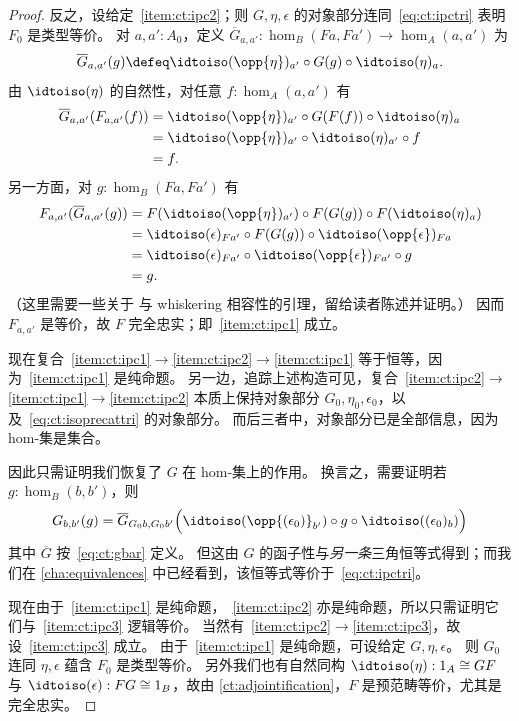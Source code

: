\begin{proof}
  反之，设给定~\ref{item:ct:ipc2}；则 $G,\eta,\epsilon$ 的对象部分连同~\eqref{eq:ct:ipctri} 表明 $F_0$ 是类型等价。
  对 $a,a':A_0$，定义 $\overline{G}_{a,a'}: \hom_B(Fa,Fa') \to \hom_A(a,a')$ 为
  \begin{equation}
    \overline{G}_{a,a'}(g) \defeq \idtoiso(\opp{\eta})_{a'} \circ G(g) \circ \idtoiso(\eta)_a.\label{eq:ct:gbar}
  \end{equation}
  由 $\idtoiso(\eta)$ 的自然性，对任意 $f:\hom_A(a,a')$ 有
  \begin{align*}
    \overline{G}_{a,a'}(F_{a,a'}(f))
    &= \idtoiso(\opp{\eta})_{a'} \circ G(F(f)) \circ \idtoiso(\eta)_a\\
    &= \idtoiso(\opp{\eta})_{a'} \circ \idtoiso(\eta)_{a'} \circ f \\
    &= f.
  \end{align*}
  另一方面，对 $g:\hom_B(Fa,Fa')$ 有
  \begin{align*}
    F_{a,a'}(\overline{G}_{a,a'}(g))
    &= F(\idtoiso(\opp{\eta})_{a'}) \circ F(G(g)) \circ F(\idtoiso(\eta)_a)\\
    &= \idtoiso(\epsilon)_{Fa'}
    \circ F(G(g))
    \circ \idtoiso(\opp{\epsilon})_{Fa}\\
    &= \idtoiso(\epsilon)_{Fa'}
    \circ \idtoiso(\opp{\epsilon})_{Fa'}
    \circ g\\
    &= g.
  \end{align*}
  （这里需要一些关于 \idtoiso 与 whiskering 相容性的引理，留给读者陈述并证明。）
  因而 $F_{a,a'}$ 是等价，故 $F$ 完全忠实；即~\ref{item:ct:ipc1} 成立。

  现在复合~\ref{item:ct:ipc1}$\to$\ref{item:ct:ipc2}$\to$\ref{item:ct:ipc1} 等于恒等，因为~\ref{item:ct:ipc1} 是纯命题。
  另一边，追踪上述构造可见，复合~\ref{item:ct:ipc2}$\to$\ref{item:ct:ipc1}$\to$\ref{item:ct:ipc2} 本质上保持对象部分 $G_0,\eta_0,\epsilon_0$，以及~\eqref{eq:ct:isoprecattri} 的对象部分。
  而后三者中，对象部分已是全部信息，因为 hom-集是集合。

  因此只需证明我们恢复了 $G$ 在 hom-集上的作用。
  换言之，需要证明若 $g:\hom_B(b,b')$，则
  \[ G_{b,b'}(g) =
  \overline{G}_{G_0b,G_0b'}\Big(\idtoiso(\opp{(\epsilon_0)}_{b'}) \circ g \circ \idtoiso((\epsilon_0)_b)\Big)
  \]
  其中 $\overline{G}$ 按~\eqref{eq:ct:gbar} 定义。
  但这由 $G$ 的函子性与\emph{另一条}三角恒等式得到；而我们在 \cref{cha:equivalences} 中已经看到，该恒等式等价于~\eqref{eq:ct:ipctri}。

  现在由于~\ref{item:ct:ipc1} 是纯命题，~\ref{item:ct:ipc2} 亦是纯命题，所以只需证明它们与~\ref{item:ct:ipc3} 逻辑等价。
  当然有~\ref{item:ct:ipc2}$\to$\ref{item:ct:ipc3}，故设~\ref{item:ct:ipc3} 成立。
  由于~\ref{item:ct:ipc1} 是纯命题，可设给定 $G,\eta,\epsilon$。
  则 $G_0$ 连同 $\eta,\epsilon$ 蕴含 $F_0$ 是类型等价。
  另外我们也有自然同构 $\idtoiso(\eta):1_A\cong GF$ 与 $\idtoiso(\epsilon):FG\cong 1_B$，故由 \cref{ct:adjointification}，$F$ 是预范畴等价，尤其是完全忠实。
\end{proof}

